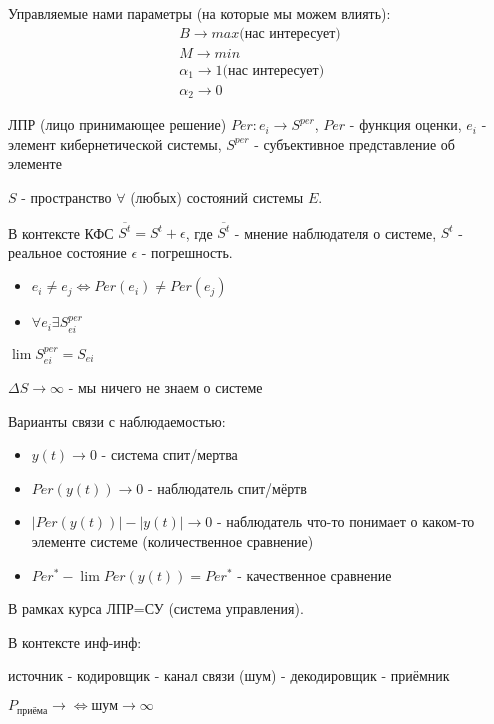 \documentclass{article}
\begin{document}
\begin{sloppypar}
    Управляемые нами параметры (на которые мы можем влиять):
    \begin{align}
        B \rightarrow max \text{(нас интересует)}      \\
        M \rightarrow min                              \\
        \alpha_1 \rightarrow 1 \text{(нас интересует)} \\
        \alpha_2 \rightarrow 0
    \end{align}

    ЛПР (лицо принимающее решение)
    $Per : e_i \rightarrow S^{per}$, $Per$ - функция оценки, $e_i$ - элемент кибернетической системы, $S^{per}$ - субъективное представление об элементе

    $S$ - пространство $\forall$ (любых) состояний системы $E$.

    В контексте КФС $\overline{S^t} = S^t + \epsilon$, где $\overline{S^t}$ - мнение наблюдателя о системе, $S^t$ - реальное состояние $\epsilon$ - погрешность.

    \begin{itemize}
        \item $e_i \neq e_j \Leftrightarrow Per(e_i) \neq Per(e_j)$
        \item $\forall e_i \exists S^{per}_{ei}$
    \end{itemize}
    $\lim S_{ei}^{per} = S_{ei}$

    $\Delta S \rightarrow \infty$ - мы ничего не знаем о системе

    Варианты связи с наблюдаемостью:
    \begin{itemize}
        \item $y(t) \rightarrow 0$ - система спит/мертва
        \item $Per(y(t)) \rightarrow 0$ - наблюдатель спит/мёртв
        \item $|Per(y(t))| - |y(t)| \rightarrow 0$ - наблюдатель что-то понимает о каком-то элементе системе (количественное сравнение)
        \item $Per^* - \lim Per(y(t)) = Per^*$ - качественное сравнение
    \end{itemize}

    В рамках курса ЛПР=СУ (система управления).

    В контексте инф-инф:

    источник - кодировщик - канал связи (шум) - декодировщик - приёмник

    $P_{приёма} \rightarrow \Leftrightarrow \text{шум} \rightarrow \infty$



\end{sloppypar}
\end{document}
